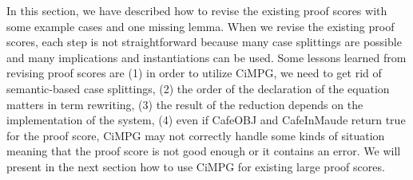 \documentclass[a4paper,fleqn]{cas-dc}
\begin{document}

In this section, we have described how to revise the existing proof scores with some example cases and one missing lemma. When we revise the existing proof scores, each step is not straightforward because many case splittings are possible and many implications and instantiations can be used.
Some lessons learned from revising proof scores are (1) in order to utilize CiMPG, we need to get rid of semantic-based case splittings, (2) the order of the declaration of the equation matters in term rewriting, (3) the result of the reduction depends on the implementation of the system, (4) even if CafeOBJ and CafeInMaude return true for the proof score, CiMPG may not correctly handle some kinds of situation meaning that the proof score is not good enough or it contains an error. We will present in the next section how to use CiMPG for existing large proof scores.
\end{document}

